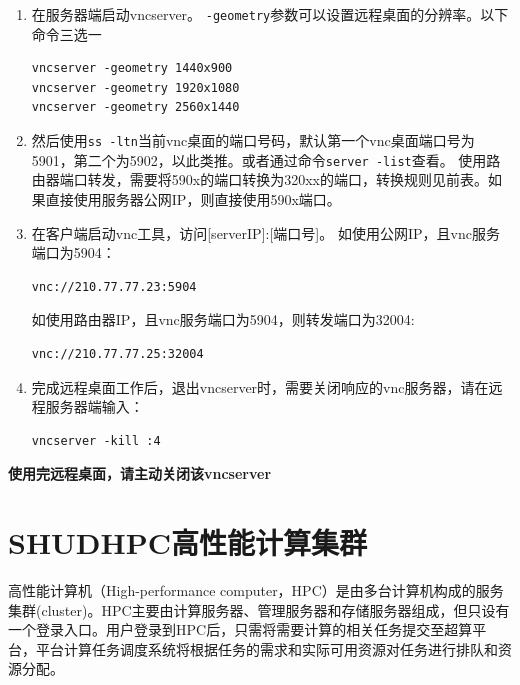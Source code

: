 \documentclass[
]{ctexbook}
\begin{document}
\begin{enumerate}
\def\labelenumi{\arabic{enumi}.}
\item
  在服务器端启动vncserver。 \texttt{-geometry}参数可以设置远程桌面的分辨率。以下命令三选一

\begin{verbatim}
vncserver -geometry 1440x900
vncserver -geometry 1920x1080
vncserver -geometry 2560x1440
\end{verbatim}
\item
  然后使用\texttt{ss\ -ltn}当前vnc桌面的端口号码，默认第一个vnc桌面端口号为5901，第二个为5902，以此类推。或者通过命令\texttt{server\ -list}查看。 使用路由器端口转发，需要将590x的端口转换为320xx的端口，转换规则见前表。如果直接使用服务器公网IP，则直接使用590x端口。
\item
  在客户端启动vnc工具，访问{[}serverIP{]}:{[}端口号{]}。
  如使用公网IP，且vnc服务端口为5904：

\begin{verbatim}
vnc://210.77.77.23:5904 
\end{verbatim}

  如使用路由器IP，且vnc服务端口为5904，则转发端口为32004:

\begin{verbatim}
vnc://210.77.77.25:32004
\end{verbatim}
\item
  完成远程桌面工作后，退出vncserver时，需要关闭响应的vnc服务器，请在远程服务器端输入：

\begin{verbatim}
vncserver -kill :4
\end{verbatim}
\end{enumerate}

\textbf{使用完远程桌面，请主动关闭该vncserver}

\hypertarget{shudhpcux9ad8ux6027ux80fdux8ba1ux7b97ux96c6ux7fa4}{%
\section{SHUDHPC高性能计算集群}\label{shudhpcux9ad8ux6027ux80fdux8ba1ux7b97ux96c6ux7fa4}}

高性能计算机（High-performance computer，HPC）是由多台计算机构成的服务集群(cluster)。HPC主要由计算服务器、管理服务器和存储服务器组成，但只设有一个登录入口。用户登录到HPC后，只需将需要计算的相关任务提交至超算平台，平台计算任务调度系统将根据任务的需求和实际可用资源对任务进行排队和资源分配。
\end{document}
